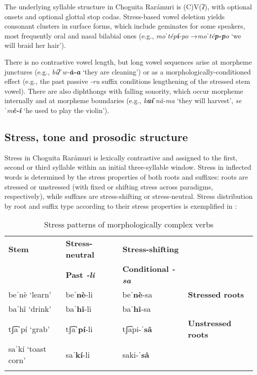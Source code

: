 The underlying syllable structure in Choguita Rarámuri is (C)V(ʔ), with optional onsets and optional glottal stop codas. Stress-based vowel deletion yields consonant clusters in surface forms, which include geminates for some speakers, most frequently oral and nasal bilabial ones (e.g., \textit{moˈtép\textbf{i}-po} →\textit{moˈté\textbf{p-p}o} `we will braid her hair').

There is no contrastive vowel length, but long vowel sequences arise at morpheme junctures (e.g., \textit{biʔˈw-\textbf{à-a}} `they are cleaning') or as a morphologically-conditioned effect (e.g., the past passive \textit{-ru} suffix conditions lengthening of the stressed stem vowel). There are also diphthongs with falling sonority, which occur morpheme internally and at morpheme boundaries (e.g., \textit{k\textbf{ai}ˈnâ-ma} `they will harvest',\textit{ seˈm\textbf{è-i}} `he used to play the violin').

\subsection{Stress, tone and prosodic structure}
\label{subsec: stress and tone}

Stress in Choguita Rarámuri is lexically contrastive and assigned to the first, second or third syllable within an initial three-syllable window. Stress in inflected words is determined by the stress properties of both roots and suffixes: roots are stressed or unstressed (with fixed or shifting stress across paradigms, respectively), while suffixes are stress-shifting or stress-neutral. Stress distribution by root and suffix type according to their stress properties is exemplified in :

\break

\begin{table}
\caption{Stress patterns of morphologically complex verbs}
\label{tab:stress2}

\begin{tabularx}{\textwidth}{XXXX}
\lsptoprule
\textbf{Stem} & \textbf{Stress-neutral} & \textbf{Stress-shifting} & \\
 & \textbf{Past \textit{-li}} & \textbf{Conditional \textit{-sa}} & \\
 \midrule
beˈnè `learn’ & be\textbf{ˈnè}-li & be\textbf{ˈnè}-sa & \textbf{Stressed roots} \\
baˈhî `drink' & ba\textbf{ˈhî}-li & ba\textbf{ˈhî}-sa & \\
tʃ͡aˈpí `grab' & tʃ͡a\textbf{ˈpí}-li & tʃ͡api-\textbf{ˈsâ} & \textbf{Unstressed roots} \\
saˈkí `toast corn' & sa\textbf{ˈkí}-li & saki-\textbf{ˈsâ} & \\
\lspbottomrule
\end{tabularx}
\end{table}

